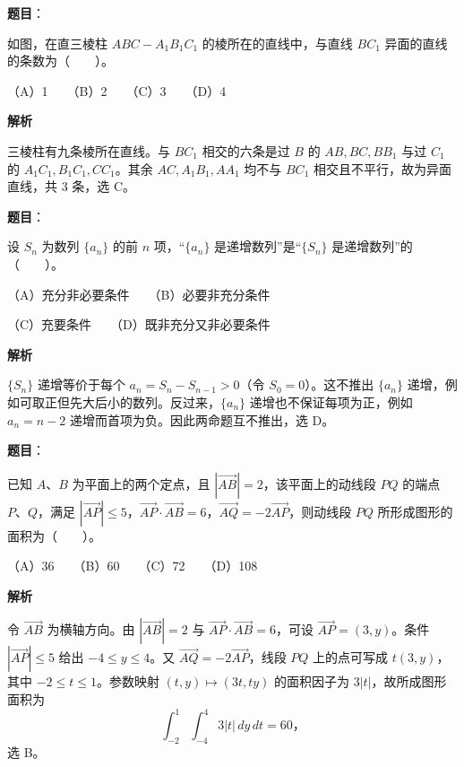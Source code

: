 \begin{answer}

\textbf{题目}：

如图，在直三棱柱 $ABC-A_1B_1C_1$ 的棱所在的直线中，与直线 $BC_1$ 异面的直线的条数为\mbox{（　　）}。

（A）1　　（B）2　　（C）3　　（D）4
\nopagebreak[4]
\begin{center}\end{center}
\nopagebreak[4]
\textbf{解析}
\nopagebreak[4]
\begin{center}\end{center}
\nopagebreak[4]
三棱柱有九条棱所在直线。与 $BC_1$ 相交的六条是过 $B$ 的 $AB,BC,BB_1$ 与过 $C_1$ 的 $A_1C_1,B_1C_1,CC_1$。其余 $AC,A_1B_1,AA_1$ 均不与 $BC_1$ 相交且不平行，故为异面直线，共 $3$ 条，选 C。


\end{answer}
\begin{answer}

\textbf{题目}：

设 $S_n$ 为数列 $\{a_n\}$ 的前 $n$ 项，“$\{a_n\}$ 是递增数列”是“$\{S_n\}$ 是递增数列”的\mbox{（　　）}。

（A）充分非必要条件　　（B）必要非充分条件

（C）充要条件　　（D）既非充分又非必要条件

\textbf{解析}

$\{S_n\}$ 递增等价于每个 $a_n=S_n-S_{n-1}>0$（令 $S_0=0$）。这不推出 $\{a_n\}$ 递增，例如可取正但先大后小的数列。反过来，$\{a_n\}$ 递增也不保证每项为正，例如 $a_n=n-2$ 递增而首项为负。因此两命题互不推出，选 D。


\end{answer}
\begin{answer}

\textbf{题目}：

已知 $A\text{、}B$ 为平面上的两个定点，且 $|\overrightarrow{AB}|=2$，该平面上的动线段 $PQ$ 的端点 $P\text{、}Q$，满足 $|\overrightarrow{AP}|\leq 5$，$\overrightarrow{AP}\cdot\overrightarrow{AB}=6$，$\overrightarrow{AQ}=-2\overrightarrow{AP}$，则动线段 $PQ$ 所形成图形的面积为\mbox{（　　）}。

（A）36　　（B）60　　（C）72　　（D）108

\textbf{解析}

令 $\overrightarrow{AB}$ 为横轴方向。由 $|\overrightarrow{AB}|=2$ 与 $\overrightarrow{AP}\cdot\overrightarrow{AB}=6$，可设 $\overrightarrow{AP}=(3,y)$。条件 $|\overrightarrow{AP}|\leq5$ 给出 $-4\leq y\leq4$。又 $\overrightarrow{AQ}=-2\overrightarrow{AP}$，线段 $PQ$ 上的点可写成 $t(3,y)$，其中 $-2\leq t\leq1$。参数映射 $(t,y)\mapsto(3t,ty)$ 的面积因子为 $3|t|$，故所成图形面积为
\nopagebreak[4]
\[
\int_{-2}^{1}\int_{-4}^{4}3|t|\,dy\,dt=60\text{，}
\]
选 B。


\end{answer}
